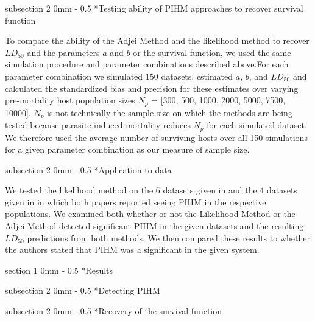 \documentclass[12pt, a4paper]{article}
\makeatletter
\renewcommand{\section}{\@startsection
{section}%
{1}%
{0mm}%
{-\baselineskip}%
{0.5\baselineskip}%
{\normalfont\bf\large}} %
\renewcommand{\subsection}{\@startsection
{subsection}%
{2}%
{0mm}%
{-\baselineskip}%
{0.5\baselineskip}%
{\normalfont\bf}} %
\makeatother
\begin{document}
\subsection*{Testing ability of PIHM approaches to recover survival function}

To compare the ability of the Adjei Method and the likelihood method to recover $LD_{50}$ and the parameters $a$ and $b$ or the survival function, we used the same simulation procedure and parameter combinations described above.For each parameter
combination we simulated 150 datasets, estimated $a$, $b$, and $LD_{50}$ and calculated the standardized bias and
precision \citep{Walther2005} for these estimates over varying pre-mortality host population sizes  $N_p$ = [300, 500, 1000, 2000, 5000, 7500,
10000]. $N_p$ is not technically the sample size on which the methods are being
tested because parasite-induced mortality reduces $N_p$ for each simulated
dataset.  We therefore used the average number of surviving hosts over all 150 simulations for a given parameter combination as our measure of sample size.

\subsection*{Application to data}

We tested the likelihood method on the 6 datasets given in \cite{Crofton1971a}
and the 4 datasets given in \citep{Adjei1986} in which both papers reported
seeing PIHM in the respective populations.  We examined both whether or not the
Likelihood Method or the Adjei Method detected significant PIHM in the given
datasets and the resulting $LD_{50}$ predictions from both methods.  We then
compared these results to whether the authors stated that PIHM was a
significant in the given system.

\section*{Results}

\subsection*{Detecting PIHM}

\subsection*{Recovery of the survival function}
\end{document}
